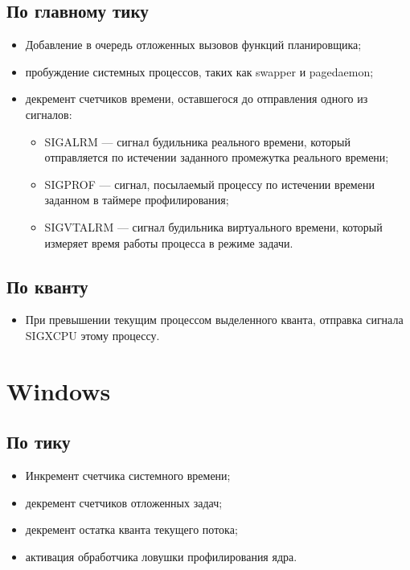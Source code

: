 \documentclass[12pt]{report}
\begin{document}
\subsection{По главному тику}
\begin{itemize}
	\item	Добавление в очередь отложенных вызовов функций планировщика;
	\item	пробуждение системных процессов, таких как swapper и pagedaemon;
	
	\item	декремент счетчиков времени, оставшегося до отправления одного из сигналов:
	\begin{itemize}
		\item	SIGALRM — сигнал будильника реального времени, который отправляется по истечении заданного промежутка реального времени;
		\item	SIGPROF —  сигнал, посылаемый процессу по истечении времени заданном в таймере профилирования;
		\item	SIGVTALRM — сигнал будильника виртуального времени,
		который измеряет время работы процесса в режиме задачи.
	\end{itemize}
\end{itemize}

\subsection{По кванту}

\begin{itemize}
	\item При превышении текущим процессом выделенного кванта, отправка сигнала SIGXCPU этому процессу.
\end{itemize}

\section{Windows}
\subsection{По тику}
\begin{itemize}
	\item Инкремент счетчика системного времени;
	\item декремент счетчиков отложенных задач;
	\item декремент остатка кванта текущего потока;
	\item активация обработчика ловушки профилирования ядра.
\end{itemize}
\end{document}
